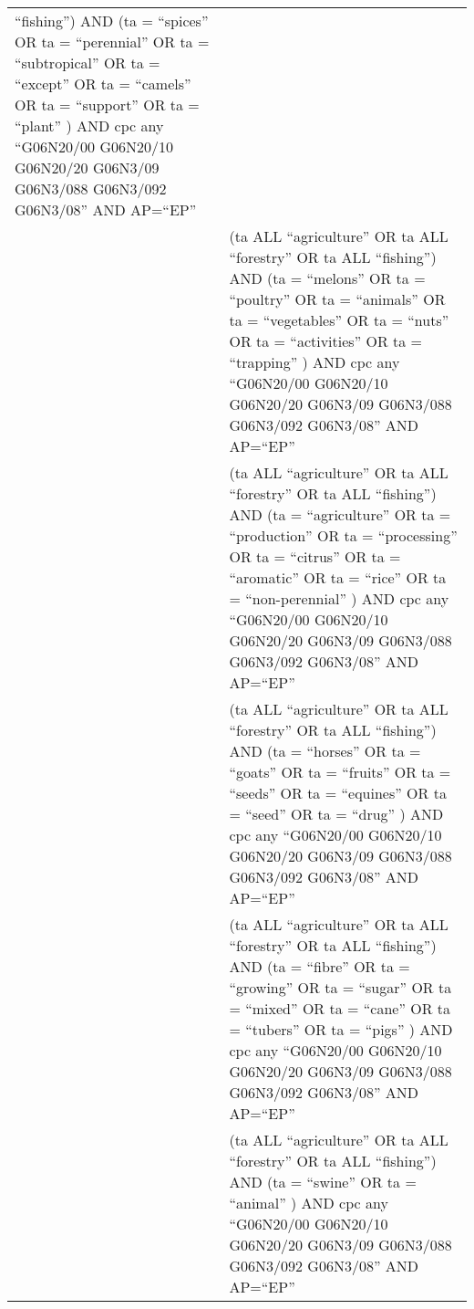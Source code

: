 \documentclass[
  11,
  a4paperpaper,
]{article}
\begin{document}
\begin{longtable}[]{@{}
  >{\raggedleft\arraybackslash}p{}
  >{\raggedright\arraybackslash}p{}@{}}
``fishing'') AND (ta = ``spices'' OR ta = ``perennial'' OR ta =
``subtropical'' OR ta = ``except'' OR ta = ``camels'' OR ta =
``support'' OR ta = ``plant'' ) AND cpc any ``G06N20/00 G06N20/10
G06N20/20 G06N3/09 G06N3/088 G06N3/092 G06N3/08'' AND AP=``EP'' \\
5 & (ta ALL ``agriculture'' OR ta ALL ``forestry'' OR ta ALL
``fishing'') AND (ta = ``melons'' OR ta = ``poultry'' OR ta =
``animals'' OR ta = ``vegetables'' OR ta = ``nuts'' OR ta =
``activities'' OR ta = ``trapping'' ) AND cpc any ``G06N20/00 G06N20/10
G06N20/20 G06N3/09 G06N3/088 G06N3/092 G06N3/08'' AND AP=``EP'' \\
6 & (ta ALL ``agriculture'' OR ta ALL ``forestry'' OR ta ALL
``fishing'') AND (ta = ``agriculture'' OR ta = ``production'' OR ta =
``processing'' OR ta = ``citrus'' OR ta = ``aromatic'' OR ta = ``rice''
OR ta = ``non-perennial'' ) AND cpc any ``G06N20/00 G06N20/10 G06N20/20
G06N3/09 G06N3/088 G06N3/092 G06N3/08'' AND AP=``EP'' \\
7 & (ta ALL ``agriculture'' OR ta ALL ``forestry'' OR ta ALL
``fishing'') AND (ta = ``horses'' OR ta = ``goats'' OR ta = ``fruits''
OR ta = ``seeds'' OR ta = ``equines'' OR ta = ``seed'' OR ta = ``drug''
) AND cpc any ``G06N20/00 G06N20/10 G06N20/20 G06N3/09 G06N3/088
G06N3/092 G06N3/08'' AND AP=``EP'' \\
8 & (ta ALL ``agriculture'' OR ta ALL ``forestry'' OR ta ALL
``fishing'') AND (ta = ``fibre'' OR ta = ``growing'' OR ta = ``sugar''
OR ta = ``mixed'' OR ta = ``cane'' OR ta = ``tubers'' OR ta = ``pigs'' )
AND cpc any ``G06N20/00 G06N20/10 G06N20/20 G06N3/09 G06N3/088 G06N3/092
G06N3/08'' AND AP=``EP'' \\
9 & (ta ALL ``agriculture'' OR ta ALL ``forestry'' OR ta ALL
``fishing'') AND (ta = ``swine'' OR ta = ``animal'' ) AND cpc any
``G06N20/00 G06N20/10 G06N20/20 G06N3/09 G06N3/088 G06N3/092 G06N3/08''
AND AP=``EP'' \\
\end{longtable}
\end{document}
